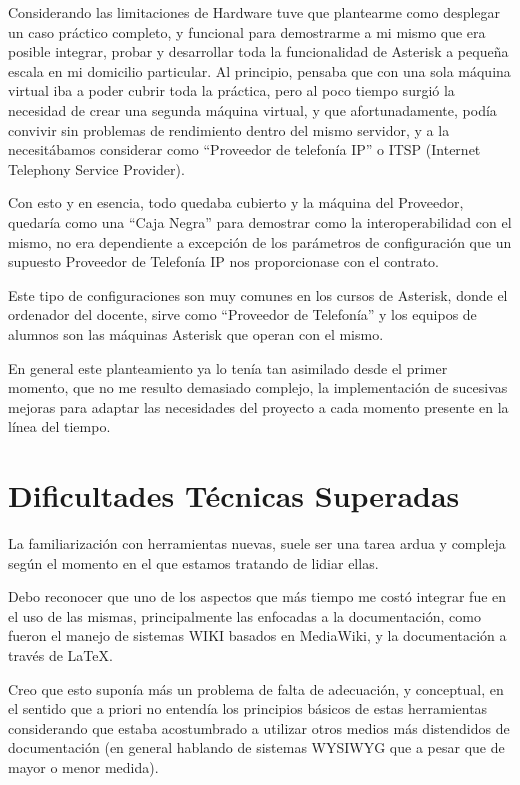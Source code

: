 Considerando las limitaciones de Hardware tuve que plantearme como desplegar un caso práctico completo, y funcional para demostrarme a mi mismo que era posible integrar, probar y desarrollar toda la funcionalidad de Asterisk a pequeña escala en mi domicilio particular. Al principio, pensaba que con una sola máquina virtual iba a poder cubrir toda la práctica, pero al poco tiempo surgió la necesidad de crear una segunda máquina virtual, y que afortunadamente, podía convivir sin problemas de rendimiento dentro del mismo servidor, y a la necesitábamos considerar como ``Proveedor de telefonía IP'' o ITSP (Internet Telephony Service Provider). 

Con esto y en esencia, todo quedaba cubierto y la máquina del Proveedor, quedaría como una ``Caja Negra'' para demostrar como la interoperabilidad con el mismo, no era dependiente a excepción de los parámetros de configuración que un supuesto Proveedor de Telefonía IP nos proporcionase con el contrato.

Este tipo de configuraciones son muy comunes en los cursos de Asterisk, donde el ordenador del docente, sirve como ``Proveedor de Telefonía'' y los equipos de alumnos son las máquinas Asterisk que operan con el mismo.

En general este planteamiento ya lo tenía tan asimilado desde el primer momento, que no me resulto demasiado complejo, la implementación de sucesivas mejoras para adaptar las necesidades del proyecto a cada momento presente en la línea del tiempo.

\section{Dificultades Técnicas Superadas}

La familiarización con herramientas nuevas, suele ser una tarea ardua y compleja según el momento en el que estamos tratando de lidiar ellas.

Debo reconocer que uno de los aspectos que más tiempo me costó integrar fue en el uso de las mismas, principalmente las enfocadas a la documentación, como fueron el manejo de sistemas WIKI basados en MediaWiki, y la documentación a través de \LaTeX. 

Creo que esto suponía más un problema de falta de adecuación, y conceptual, en el sentido que a priori no entendía los principios básicos de estas herramientas considerando que estaba acostumbrado a utilizar otros medios más distendidos de documentación (en general hablando de sistemas WYSIWYG que a pesar que de mayor o menor medida).

